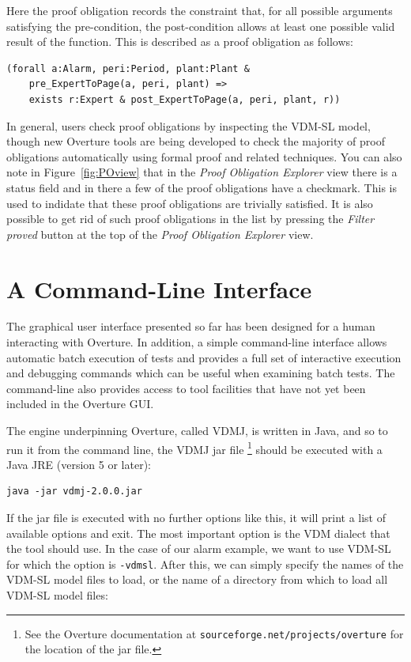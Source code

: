Here the proof obligation records the constraint that, for all
possible arguments satisfying the pre-condition, the post-condition
allows at least one possible valid result of the function. This is
described as a proof obligation as follows:

\begin{lstlisting}
(forall a:Alarm, peri:Period, plant:Plant &
    pre_ExpertToPage(a, peri, plant) => 
    exists r:Expert & post_ExpertToPage(a, peri, plant, r))
\end{lstlisting}

In general, users check proof obligations by inspecting the VDM-SL model,
though new Overture tools are being developed to check the majority of
proof obligations automatically using formal proof and related
techniques. You can also note in Figure~\ref{fig:POview} that in the
\emph{Proof Obligation Explorer} view there is a status field and in there
a few of the proof obligations have a checkmark. This is used to
indidate that these proof obligations are trivially satisfied. It is
also possible to get rid of such proof obligations in the list by
pressing the \emph{Filter proved} button at the top of the \emph{Proof
  Obligation Explorer} view.

\section{A Command-Line Interface}\label{sec:cmdline}

The graphical user interface presented so far has been designed for a
human interacting with Overture. In addition, a simple command-line
interface allows automatic batch execution of tests and provides a
full set of interactive execution and debugging commands which can be
useful when examining batch tests. The command-line also provides
access to tool facilities that have not yet been included in the
Overture GUI.

The engine underpinning Overture, called VDMJ, is written in Java, and
so to run it from the command line, the VDMJ jar file \footnote{See
  the Overture documentation at
  \texttt{sourceforge.net/projects/overture} for the location of the
  jar file.}  should be executed with a Java JRE (version 5 or later):

\lstset{style=tool,language=}
\begin{lstlisting}
java -jar vdmj-2.0.0.jar
\end{lstlisting}

\noindent If the jar file is executed with no further options like
this, it will print a list of available options and exit. The most
important option is the VDM dialect that the tool should use. In the
case of our alarm example, we want to use VDM-SL for which the option
is \verb|-vdmsl|. After this, we can simply specify the names of the
VDM-SL model files to load, or the name of a directory from which to
load all VDM-SL model files:

